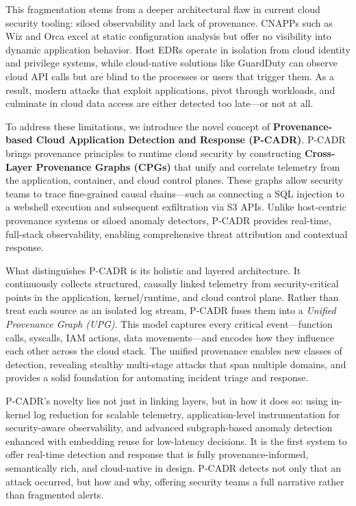 This fragmentation stems from a deeper architectural flaw in current cloud security tooling: siloed observability and lack of provenance. CNAPPs such as Wiz and Orca excel at static configuration analysis but offer no visibility into dynamic application behavior. Host EDRs operate in isolation from cloud identity and privilege systems, while cloud-native solutions like GuardDuty can observe cloud API calls but are blind to the processes or users that trigger them. As a result, modern attacks that exploit applications, pivot through workloads, and culminate in cloud data access are either detected too late—or not at all.

To address these limitations, we introduce the novel concept of \textbf{Provenance-based Cloud Application Detection and Response (P-CADR)}. P-CADR brings provenance principles to runtime cloud security by constructing \textbf{Cross-Layer Provenance Graphs (CPGs)} that unify and correlate telemetry from the application, container, and cloud control planes. These graphs allow security teams to trace fine-grained causal chains—such as connecting a SQL injection to a webshell execution and subsequent exfiltration via S3 APIs. Unlike host-centric provenance systems or siloed anomaly detectors, P-CADR provides real-time, full-stack observability, enabling comprehensive threat attribution and contextual response.

What distinguishes P-CADR is its holistic and layered architecture. It continuously collects structured, causally linked telemetry from security-critical points in the application, kernel/runtime, and cloud control plane. Rather than treat each source as an isolated log stream, P-CADR fuses them into a \textit{Unified Provenance Graph (UPG)}. This model captures every critical event—function calls, syscalls, IAM actions, data movements—and encodes how they influence each other across the cloud stack. The unified provenance enables new classes of detection, revealing stealthy multi-stage attacks that span multiple domains, and provides a solid foundation for automating incident triage and response.

P-CADR's novelty lies not just in linking layers, but in how it does so: using in-kernel log reduction for scalable telemetry, application-level instrumentation for security-aware observability, and advanced subgraph-based anomaly detection enhanced with embedding reuse for low-latency decisions. It is the first system to offer real-time detection and response that is fully provenance-informed, semantically rich, and cloud-native in design. P-CADR detects not only that an attack occurred, but how and why, offering security teams a full narrative rather than fragmented alerts.

